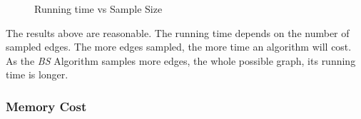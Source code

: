 \documentclass[runningheads,a4paper]{llncs}
\begin{document}
\begin{figure}[htbp]
\vspace{-0.7cm}
  \centering
\vspace{-0.3cm}
  \caption{Running time vs Sample Size}
  \label{fig:time}
\vspace{-0.6cm}
\end{figure}

The results above are reasonable. The running time depends on the number of sampled edges. The more edges sampled, the more time an algorithm will cost. As the \emph{BS} Algorithm samples more edges, the whole possible graph, its running time is longer.


\subsubsection{Memory Cost}
\label{sec:exp:memory}
\end{document}
